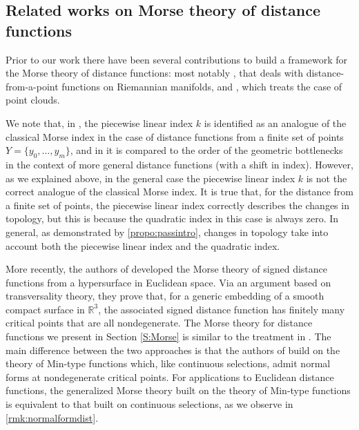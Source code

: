 \documentclass{amsart}
\newcommand{\R}{\mathbb{R}}
\theoremstyle{definition}
\theoremstyle{remark}
\begin{document}
\subsection{Related works on Morse theory of distance functions}\label{sec:related}
Prior to our work there have been several contributions to build a framework for the Morse theory of distance functions: most notably \cite{cheeger}, that deals with distance-from-a-point functions on Riemannian manifolds, and \cite{bobrowski2014distance}, which treats the case of point clouds. 

We note that, in \cite{bobrowski2014distance}, the piecewise linear index $k$ is identified as an analogue of the classical Morse index in the case of distance functions from a finite set of points $Y = \{y_0, \ldots, y_m\}$, and in \cite[Remark 4.2]{DEEGH2023} it is compared to the order of the geometric bottlenecks in the context of more general distance functions (with a shift in index). However, as we explained above, in the general case the piecewise linear index $k$ is not the correct analogue of the classical Morse index. It is true that, for the distance from a finite set of points, the piecewise linear index correctly describes the changes in topology, but this is because the quadratic index in this case is always zero. In general, as demonstrated by \cref{propo:passintro}, changes in topology take into account both the piecewise linear index and the quadratic index.

More recently, the authors of \cite{song2023generalized} developed the Morse theory of signed distance functions from a hypersurface in Euclidean space. Via an argument based on transversality theory, they prove that, for a generic embedding of a smooth compact surface in $\R^3$, the associated signed distance function has finitely many critical points that are all nondegenerate. 
The Morse theory for distance functions we present in Section \ref{S:Morse} is similar to the treatment in \cite[Sect.~3]{song2023generalized}. The main difference between the two approaches is that the authors of \cite{song2023generalized} build on the theory of Min-type functions \cite{gershkovich1997morse} which, like continuous selections, admit normal forms at nondegenerate critical points.
For applications to Euclidean distance functions, the generalized Morse theory built on the theory of Min-type functions is equivalent to that built on continuous selections, as we observe in \cref{rmk:normalformdist}.
\end{document}
